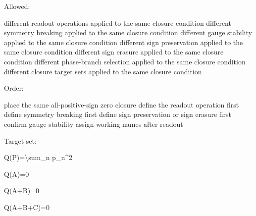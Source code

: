 \documentclass[
  a4paper,
]{article}
\newenvironment{Shaded}{}{}
\newcommand{\NormalTok}[1]{#1}
\begin{document}
Allowed:

\begin{Shaded}
\begin{Highlighting}[]
\NormalTok{different readout operations applied to the same closure condition}
\NormalTok{different symmetry breaking applied to the same closure condition}
\NormalTok{different gauge stability applied to the same closure condition}
\NormalTok{different sign preservation applied to the same closure condition}
\NormalTok{different sign erasure applied to the same closure condition}
\NormalTok{different phase{-}branch selection applied to the same closure condition}
\NormalTok{different closure target sets applied to the same closure condition}
\end{Highlighting}
\end{Shaded}

Order:

\begin{Shaded}
\begin{Highlighting}[]
\NormalTok{place the same all{-}positive{-}sign zero closure}
\NormalTok{define the readout operation first}
\NormalTok{define symmetry breaking first}
\NormalTok{define sign preservation or sign erasure first}
\NormalTok{confirm gauge stability}
\NormalTok{assign working names after readout}
\end{Highlighting}
\end{Shaded}

Target set:

\begin{Shaded}
\begin{Highlighting}[]
\NormalTok{Q(P)=\textbackslash{}sum\_n p\_n\^{}2}
\end{Highlighting}
\end{Shaded}

\begin{Shaded}
\begin{Highlighting}[]
\NormalTok{Q(A)=0}
\end{Highlighting}
\end{Shaded}

\begin{Shaded}
\begin{Highlighting}[]
\NormalTok{Q(A+B)=0}
\end{Highlighting}
\end{Shaded}

\begin{Shaded}
\begin{Highlighting}[]
\NormalTok{Q(A+B+C)=0}
\end{Highlighting}
\end{Shaded}
\end{document}
